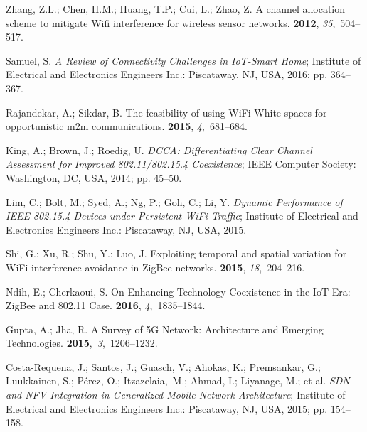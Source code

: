 \documentclass[symmetry,article,accept,moreauthors,pdftex10pt,a4paper]{mdpi}
\begin{document}
\begin{thebibliography}{999}
Zhang, Z.L.; Chen, H.M.; Huang, T.P.; Cui, L.; Zhao, Z.
\newblock A channel allocation scheme to mitigate Wifi interference for
wireless sensor networks.
 {\bf 2012}, {\em
	35},~504--517.

Samuel, S.
\newblock \emph{A Review of Connectivity Challenges in IoT-Smart Home};
\newblock Institute of Electrical and Electronics Engineers Inc.: Piscataway, NJ, USA, 2016; pp.
364--367.

Rajandekar, A.; Sikdar, B.
\newblock The feasibility of using WiFi White spaces for opportunistic m2m
communications.
 {\bf 2015}, {\em
	4},~681--684.

King, A.; Brown, J.; Roedig, U.
\newblock \emph{DCCA: Differentiating Clear Channel Assessment for Improved
	802.11/802.15.4 Coexistence};
\newblock IEEE Computer Society: Washington, DC, USA, 2014; pp. 45--50.

Lim, C.; Bolt, M.; Syed, A.; Ng, P.; Goh, C.; Li, Y.
\newblock\emph{ Dynamic Performance of IEEE 802.15.4 Devices under Persistent WiFi
	Traffic};
\newblock Institute of Electrical and Electronics Engineers Inc.: Piscataway, NJ, USA, 2015.

Shi, G.; Xu, R.; Shu, Y.; Luo, J.
\newblock Exploiting temporal and spatial variation for WiFi interference
avoidance in ZigBee networks.
 {\bf 2015}, {\em
	18},~204--216.

Ndih, E.; Cherkaoui, S.
\newblock On Enhancing Technology Coexistence in the IoT Era: ZigBee and 802.11
Case.
 {\bf 2016}, {\em 4},~1835--1844.

Gupta, A.; Jha, R.
\newblock A Survey of 5G Network: Architecture and Emerging Technologies.
 {\bf 2015},~{\em 3},~1206--1232.

Costa-Requena, J.; Santos, J.; Guasch, V.; Ahokas, K.; Premsankar, G.;
Luukkainen, S.; Pérez, O.; Itzazelaia,~M.; Ahmad, I.; Liyanage, M.;
et al.
\newblock \emph{SDN and NFV Integration in Generalized Mobile Network Architecture};
\newblock Institute of Electrical and Electronics Engineers Inc.: Piscataway, NJ, USA, 2015; pp.
154--158.


\end{thebibliography}
\end{document}
